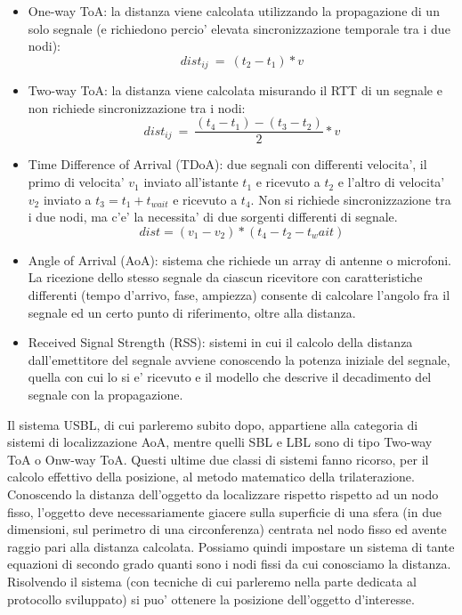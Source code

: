 \begin{itemize}
    \item One-way ToA: la distanza viene calcolata utilizzando la propagazione di un solo segnale (e richiedono percio' elevata sincronizzazione temporale tra i due nodi):
    \[dist_{ij}\ =\ (t_2-t_1)*v\]
    \item Two-way ToA: la distanza viene calcolata misurando il RTT di un segnale e non richiede sincronizzazione tra i nodi:
    \[dist_{ij}\ =\ \frac{(t_4-t_1)-(t_3-t_2)}{2}*v\]
    \item Time Difference of Arrival (TDoA): due segnali con differenti velocita', il primo di velocita' $v_1$ inviato all'istante $t_1$ e ricevuto a $t_2$ e l'altro di velocita' $v_2$ inviato a $t_3 = t_1 + t_{wait}$ e ricevuto a $t_4$. Non si richiede sincronizzazione tra i due nodi, ma c'e' la necessita' di due sorgenti differenti di segnale.
    \[dist = (v_1 - v_2)*(t_4 - t_2 - t_wait)\]
    \item Angle of Arrival (AoA): sistema che richiede un array di antenne o microfoni. La ricezione dello stesso segnale da ciascun ricevitore con caratteristiche differenti (tempo d'arrivo, fase, ampiezza) consente di calcolare l'angolo fra il segnale ed un certo punto di riferimento, oltre alla distanza.
    \item Received Signal Strength (RSS): sistemi in cui il calcolo della distanza dall'emettitore del segnale avviene conoscendo la potenza iniziale del segnale, quella con cui lo si e' ricevuto e il modello che descrive il decadimento del segnale con la propagazione.
\end{itemize}
Il sistema USBL, di cui parleremo subito dopo, appartiene alla categoria di sistemi di localizzazione AoA, mentre quelli SBL e LBL sono di tipo Two-way ToA o Onw-way ToA.
Questi ultime due classi di sistemi fanno ricorso, per il calcolo effettivo della posizione, al metodo matematico della trilaterazione.
Conoscendo la distanza dell'oggetto da localizzare rispetto rispetto ad un nodo fisso, l'oggetto deve necessariamente giacere sulla superficie di una sfera (in due dimensioni, sul perimetro di una circonferenza) centrata nel nodo fisso ed avente raggio pari alla distanza calcolata. Possiamo quindi impostare un sistema di tante equazioni di secondo grado quanti sono i nodi fissi da cui conosciamo la distanza. Risolvendo il sistema (con tecniche di cui parleremo nella parte dedicata al protocollo sviluppato) si puo' ottenere la posizione dell'oggetto d'interesse.


